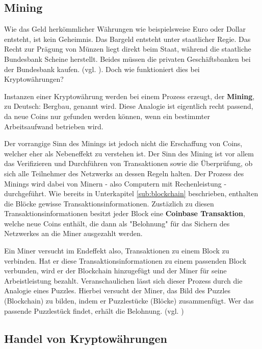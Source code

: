 \documentclass[oneside]{ausarbeitung}
\begin{document}
\subsection{Mining}
\label{sub:mining}

Wie das Geld herkömmlicher Währungen wie beispielsweise Euro oder Dollar entsteht, ist kein Geheimnis. Das Bargeld entsteht unter staatlicher Regie. Das Recht zur Prägung von Münzen liegt direkt beim Staat, während die staatliche Bundesbank Scheine herstellt. Beides müssen die privaten Geschäftsbanken bei der Bundesbank kaufen. (vgl. \cite{herstellung_fiat_waehrung}). Doch wie funktioniert dies bei Kryptowährungen? 

Instanzen einer Kryptowährung werden bei einem Prozess erzeugt, der \textbf{Mining}, zu Deutsch: Bergbau, genannt wird. Diese Analogie ist eigentlich recht passend, da neue Coins nur gefunden werden können, wenn ein bestimmter Arbeitsaufwand betrieben wird.

Der vorrangige Sinn des Minings ist jedoch nicht die Erschaffung von Coins, welcher eher als Nebeneffekt zu verstehen ist. Der Sinn des Mining ist vor allem das Verifizieren und Durchführen von Transaktionen sowie die Überprüfung, ob sich alle Teilnehmer des Netzwerks an dessen Regeln halten. Der Prozess des Minings wird dabei von Minern - also Computern mit Rechenleistung - durchgeführt. Wie bereits in Unterkapitel \ref{sub:blockchain} beschrieben, enthalten die Blöcke gewisse Transaktionsinformationen. Zustäzlich zu diesen Transaktionsinformationen besitzt jeder Block eine \textbf{Coinbase Transaktion}, welche neue Coins enthält, die dann als "Belohnung" für das Sichern des Netzwerkes an die Miner ausgezahlt werden. 

Ein Miner versucht im Endeffekt also, Transaktionen zu einem Block zu verbinden. Hat er diese Transaktionsinformationen zu einem passenden Block verbunden, wird er der Blockchain hinzugefügt und der Miner für seine Arbeistleistung bezahlt. Veranschaulichen lässt sich dieser Prozess durch die Analogie eines Puzzles.  Hierbei versucht der Miner, das Bild des Puzzles (Blockchain) zu bilden, indem er Puzzlestücke (Blöcke) zusammenfügt. Wer das passende Puzzlestück findet, erhält die Belohnung. (vgl. \cite{mining})


\subsection{Handel von Kryptowährungen}
\label{sub:handel_von_kryptowährungen}
\end{document}
